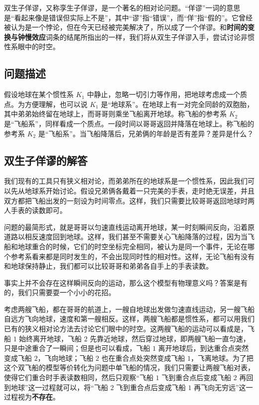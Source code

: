 

双生子佯谬，又称孪生子佯谬，是一个著名的相对论问题。“佯谬”一词的意思是“看起来像是错误但实际上不是”，其中“谬”指“错误”，而“佯”指“假的”。它曾经被认为是一个悖论，但在今天已经被完美解决了，所以成了一个佯谬。和\textbf{时间的变换与钟慢效应}词条的结尾所指出的一样，我们将从双生子佯谬入手，尝试讨论非惯性系眼中的时空。

\subsection{问题描述}

假设地球在某个惯性系 $K_1$ 中静止，忽略一切引力等作用，把地球考虑成一个质点。为方便理解，也可以说 $K_1$ 是“地球系”。在地球上有一对完全同龄的双胞胎，其中弟弟始终留在地球上，而哥哥则乘坐飞船离开地球。称飞船的参考系 $K_2$ 是“飞船系”，同样看成一个质点。一段时间以哥哥返回并降落在地球上。称飞船的参考系 $K_2$ 是“飞船系”。当飞船降落后，兄弟俩的年龄是否有差异？差异是什么？

\subsection{双生子佯谬的解答}

我们现有的工具只有狭义相对论，而弟弟所在的地球系是一个惯性系，因此我们可以先从地球系开始讨论。假设兄弟俩各戴着一只完美的手表，走时绝无误差，并且双方都把飞船出发的一刻设为时间零点。这样，我们只需要比较哥哥返回地球时两人手表的读数即可。

问题的最简形式，就是哥哥以匀速直线运动离开地球，某一时刻瞬间反向，沿着原道路以相反速度回到地球。这样，我们甚至不需要关心飞船降落的过程，因为当飞船和地球重合的时候，它们的时空坐标完全相同，被认为是同一个事件，无论在哪个参考系看来都是同时发生的，不会出现同时性的相对性。这样，无论飞船有没有和地球保持静止，我们都可以比较哥哥和弟弟各自手上的手表读数。

事实上并不会存在这样瞬间反向的运动，那么这个模型有物理意义吗？答案是有的，我们只需要耍一个小小的花招。

考虑两艘飞船，都在哥哥的航道上，一艘自地球出发做匀速直线运动，另一艘飞船自远方飞向地球，速度和第一艘相反。这样，两艘飞船都是惯性系，都可以用我们已有的狭义相对论方法去讨论它们眼中的时空。这两艘飞船的运动可以看成是，飞船 $1$ 始终离开地球，飞船 $2$ 先靠近地球，然后穿过地球，即两艘飞船一直匀速，只是中途重合了一瞬间；但是也可以看成，飞船 $1$ 离开地球后，到达重合点突然变成飞船 $2$，飞向地球；飞船 $2$ 也在重合点处突然变成飞船 $1$，飞离地球。为了把这个双飞船的模型等价转化为问题中单飞船的情况，我们只需要让两艘飞船对表，使得它们重合时手表读数相同，然后只观察“飞船 $1$ 飞到重合点后变成飞船 $2$ 再回到地球”这一过程就可以，将“飞船 $2$ 飞到重合点后变成飞船 $1$ 再飞向无穷远”这一过程视为\textbf{不存在}。

